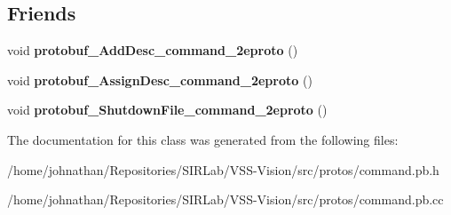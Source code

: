 \subsection*{Friends}
\begin{DoxyCompactItemize}
\item 
void {\bfseries protobuf\+\_\+\+Add\+Desc\+\_\+command\+\_\+2eproto} ()\hypertarget{classvss__command_1_1Global__Commands_a4825d92f856fcb4b02c67b601c433796}{}\label{classvss__command_1_1Global__Commands_a4825d92f856fcb4b02c67b601c433796}

\item 
void {\bfseries protobuf\+\_\+\+Assign\+Desc\+\_\+command\+\_\+2eproto} ()\hypertarget{classvss__command_1_1Global__Commands_a4c6fb97c25079d49daf010087d869100}{}\label{classvss__command_1_1Global__Commands_a4c6fb97c25079d49daf010087d869100}

\item 
void {\bfseries protobuf\+\_\+\+Shutdown\+File\+\_\+command\+\_\+2eproto} ()\hypertarget{classvss__command_1_1Global__Commands_a4cf10633ad46690f5eec6bdbbcf62de0}{}\label{classvss__command_1_1Global__Commands_a4cf10633ad46690f5eec6bdbbcf62de0}

\end{DoxyCompactItemize}


The documentation for this class was generated from the following files\+:\begin{DoxyCompactItemize}
\item 
/home/johnathan/\+Repositories/\+S\+I\+R\+Lab/\+V\+S\+S-\/\+Vision/src/protos/command.\+pb.\+h\item 
/home/johnathan/\+Repositories/\+S\+I\+R\+Lab/\+V\+S\+S-\/\+Vision/src/protos/command.\+pb.\+cc\end{DoxyCompactItemize}
